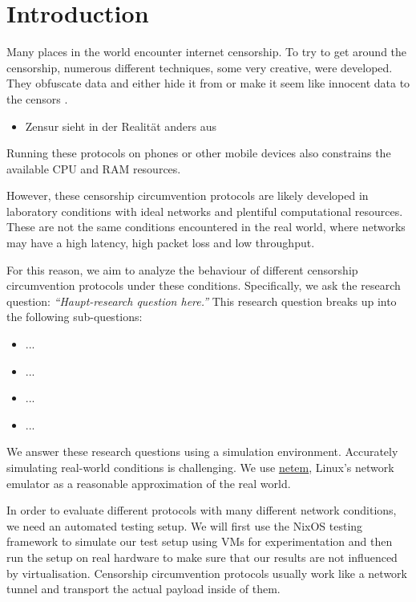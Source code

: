 
\chapter{Introduction}


Many places in the world encounter internet censorship.
To try to get around the censorship, numerous different techniques, some very creative, were developed.
They obfuscate data and either hide it from or make it seem like innocent data to the censors .

\begin{itemize}
  \item Zensur sieht in der Realität anders aus
\end{itemize}
Running these protocols on phones or other mobile devices also constrains the available CPU and RAM resources.

However, these censorship circumvention protocols are likely developed in laboratory conditions with ideal networks and plentiful computational resources.
These are not the same conditions encountered in the real world, where networks may have a high latency, high packet loss and low throughput.

For this reason, we aim to analyze the behaviour of different censorship circumvention protocols under these conditions.
Specifically, we ask the research question:
\emph{``Haupt-research question here.''}
This research question breaks up into the following sub-questions:
\begin{itemize}
  \item ...
  \item ...
  \item ...
  \item ...
\end{itemize}

We answer these research questions using a simulation environment.
Accurately simulating real-world conditions is challenging.
We use \href{https://man7.org/linux/man-pages/man8/tc-netem.8.html}{netem}, Linux's network emulator as a reasonable approximation of the real world.

In order to evaluate different protocols with many different network conditions, we need an automated testing setup.
We will first use the NixOS testing framework to simulate our test setup using VMs for experimentation and then run the setup on real hardware to make sure that our results are not influenced by virtualisation.
Censorship circumvention protocols usually work like a network tunnel and transport the actual payload inside of them.

